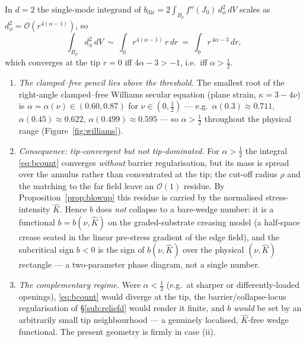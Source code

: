 \begin{proposition}
    \label{prop:bcount}
    In $d=2$ the single-mode integrand of $b_{\mathrm{dir}}=2\!\int_{B_\rho}f''(J_0)\,d_\phi^2\,dV$ scales as
    $d_\phi^2=\mathcal{O}(r^{4(\alpha-1)})$, so
    \begin{equation}
        \label{eq:bcount}
        \int_{B_\rho} d_\phi^2\,dV \ \sim\ \int_0 r^{4(\alpha-1)}\,r\,dr \ =\ \int_0 r^{\,4\alpha-3}\,dr,
    \end{equation}
    which converges at the tip $r=0$ iff $4\alpha-3>-1$, i.e.\ iff $\alpha>\tfrac12$.
    \begin{enumerate}
        \item[\textup{(i)}] \emph{The clamped--free pencil lies above the threshold.} The smallest root of the
              right-angle clamped--free Williams secular equation (plane strain, $\kappa=3-4\nu$) is
              $\alpha=\alpha(\nu)\in(0.60,0.87)$ for $\nu\in(0,\tfrac12)$ --- e.g.\ $\alpha(0.3)\approx0.711$,
              $\alpha(0.45)\approx0.622$, $\alpha(0.499)\approx0.595$ --- so $\alpha>\tfrac12$ throughout the physical
              range (Figure~\ref{fig:williams}).
        \item[\textup{(ii)}] \emph{Consequence: tip-convergent but not tip-dominated.} For $\alpha>\tfrac12$ the integral
              \eqref{eq:bcount} converges \emph{without} barrier regularisation, but its mass is spread over the annulus
              rather than concentrated at the tip; the cut-off radius $\rho$ and the matching to the far field leave an
              $\mathcal{O}(1)$ residue. By Proposition~\ref{prop:blowup} this residue is carried by the normalised
              stress-intensity $\hat K$. Hence $b$ does \emph{not} collapse to a bare-wedge number: it is a functional
              $b=b(\nu,\hat K)$ on the graded-substrate creasing model (a half-space crease seated in the linear
              pre-stress gradient of the edge field), and the subcritical sign $b<0$ is the sign of $b(\nu,\hat K)$ over
              the physical $(\nu,\hat K)$ rectangle --- a two-parameter phase diagram, not a single number.
        \item[\textup{(iii)}] \emph{The complementary regime.} Were $\alpha<\tfrac12$ (e.g.\ at sharper or
              differently-loaded openings), \eqref{eq:bcount} would diverge at the tip, the barrier/collapse-locus
              regularisation of \S\ref{sub:reliefd} would render it finite, and $b$ \emph{would} be set by an
              arbitrarily small tip neighbourhood --- a genuinely localised, $\hat K$-free wedge functional. The present
              geometry is firmly in case (ii).
    \end{enumerate}
\end{proposition}

